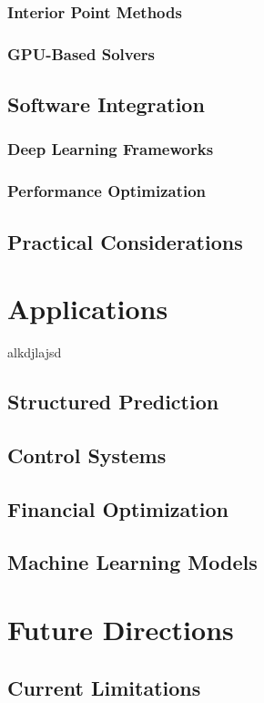 \documentclass{article}
\begin{document}
    \subsubsection{Interior Point Methods}
    \subsubsection{GPU-Based Solvers}
\subsection{Software Integration}
    \subsubsection{Deep Learning Frameworks}
    \subsubsection{Performance Optimization}
\subsection{Practical Considerations}

\section{Applications}

alkdjlajsd
\subsection{Structured Prediction}
\subsection{Control Systems}
\subsection{Financial Optimization}
\subsection{Machine Learning Models}

\section{Future Directions}
\subsection{Current Limitations}
\end{document}
